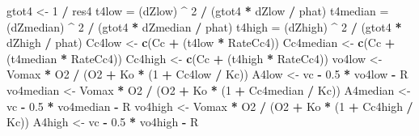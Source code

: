 \documentclass[
]{krantz}
\makeatletter
\newenvironment{Shaded}{\begin{snugshade}}{\end{snugshade}}
\newcommand{\DecValTok}[1]{\textcolor[rgb]{0.00,0.00,0.81}{#1}}
\newcommand{\FloatTok}[1]{\textcolor[rgb]{0.00,0.00,0.81}{#1}}
\newcommand{\KeywordTok}[1]{\textcolor[rgb]{0.13,0.29,0.53}{\textbf{#1}}}
\newcommand{\NormalTok}[1]{#1}
\newcommand{\OperatorTok}[1]{\textcolor[rgb]{0.81,0.36,0.00}{\textbf{#1}}}
\newcommand{\StringTok}[1]{\textcolor[rgb]{0.31,0.60,0.02}{#1}}
\newenvironment{kframe}{%
\medskip{}
\setlength{\fboxsep}{.8em}
 \def\at@end@of@kframe{}%
 \ifinner\ifhmode%
  \def\at@end@of@kframe{\end{minipage}}%
  \begin{minipage}{\columnwidth}%
 \fi\fi%
 \def\FrameCommand##1{\hskip\@totalleftmargin \hskip-\fboxsep
 \colorbox{shadecolor}{##1}\hskip-\fboxsep
     \hskip-\linewidth \hskip-\@totalleftmargin \hskip\columnwidth}%
 \MakeFramed {\advance\hsize-\width
   \@totalleftmargin\z@ \linewidth\hsize
   \@setminipage}}%
 {\par\unskip\endMakeFramed%
 \at@end@of@kframe}
\renewenvironment{Shaded}{\begin{kframe}}{\end{kframe}}
\makeatother
\begin{document}
\begin{Shaded}
\begin{Highlighting}[]
\NormalTok{gtot4 <-}\StringTok{ }\DecValTok{1} \OperatorTok{/}\StringTok{ }\NormalTok{res4}
\NormalTok{t4low =}\StringTok{ }\NormalTok{(dZlow) }\OperatorTok{^}\StringTok{ }\DecValTok{2} \OperatorTok{/}\StringTok{ }\NormalTok{(gtot4 }\OperatorTok{*}\StringTok{ }\NormalTok{dZlow }\OperatorTok{/}\StringTok{ }\NormalTok{phat)}
\NormalTok{t4median =}\StringTok{ }\NormalTok{(dZmedian) }\OperatorTok{^}\StringTok{ }\DecValTok{2} \OperatorTok{/}\StringTok{ }\NormalTok{(gtot4 }\OperatorTok{*}\StringTok{ }\NormalTok{dZmedian }\OperatorTok{/}\StringTok{ }\NormalTok{phat)}
\NormalTok{t4high =}\StringTok{ }\NormalTok{(dZhigh) }\OperatorTok{^}\StringTok{ }\DecValTok{2} \OperatorTok{/}\StringTok{ }\NormalTok{(gtot4 }\OperatorTok{*}\StringTok{ }\NormalTok{dZhigh }\OperatorTok{/}\StringTok{ }\NormalTok{phat)}
\NormalTok{Cc4low <-}\StringTok{ }\KeywordTok{c}\NormalTok{(Cc }\OperatorTok{+}\StringTok{ }\NormalTok{(t4low }\OperatorTok{*}\StringTok{ }\NormalTok{RateCc4))}
\NormalTok{Cc4median <-}\StringTok{ }\KeywordTok{c}\NormalTok{(Cc }\OperatorTok{+}\StringTok{ }\NormalTok{(t4median }\OperatorTok{*}\StringTok{ }\NormalTok{RateCc4))}
\NormalTok{Cc4high <-}\StringTok{ }\KeywordTok{c}\NormalTok{(Cc }\OperatorTok{+}\StringTok{ }\NormalTok{(t4high }\OperatorTok{*}\StringTok{ }\NormalTok{RateCc4))}
\NormalTok{vo4low <-}\StringTok{ }\NormalTok{Vomax }\OperatorTok{*}\StringTok{ }\NormalTok{O2 }\OperatorTok{/}\StringTok{ }\NormalTok{(O2 }\OperatorTok{+}\StringTok{ }\NormalTok{Ko }\OperatorTok{*}\StringTok{ }\NormalTok{(}\DecValTok{1} \OperatorTok{+}\StringTok{ }\NormalTok{Cc4low }\OperatorTok{/}\StringTok{ }\NormalTok{Kc)) }
\NormalTok{A4low <-}\StringTok{ }\NormalTok{vc }\OperatorTok{-}\StringTok{ }\FloatTok{0.5} \OperatorTok{*}\StringTok{ }\NormalTok{vo4low }\OperatorTok{-}\StringTok{ }\NormalTok{R }
\NormalTok{vo4median <-}\StringTok{ }\NormalTok{Vomax }\OperatorTok{*}\StringTok{ }\NormalTok{O2 }\OperatorTok{/}\StringTok{ }\NormalTok{(O2 }\OperatorTok{+}\StringTok{ }\NormalTok{Ko }\OperatorTok{*}\StringTok{ }\NormalTok{(}\DecValTok{1} \OperatorTok{+}\StringTok{ }\NormalTok{Cc4median }\OperatorTok{/}\StringTok{ }\NormalTok{Kc)) }
\NormalTok{A4median <-}\StringTok{ }\NormalTok{vc }\OperatorTok{-}\StringTok{ }\FloatTok{0.5} \OperatorTok{*}\StringTok{ }\NormalTok{vo4median }\OperatorTok{-}\StringTok{ }\NormalTok{R }
\NormalTok{vo4high <-}\StringTok{ }\NormalTok{Vomax }\OperatorTok{*}\StringTok{ }\NormalTok{O2 }\OperatorTok{/}\StringTok{ }\NormalTok{(O2 }\OperatorTok{+}\StringTok{ }\NormalTok{Ko }\OperatorTok{*}\StringTok{ }\NormalTok{(}\DecValTok{1} \OperatorTok{+}\StringTok{ }\NormalTok{Cc4high }\OperatorTok{/}\StringTok{ }\NormalTok{Kc)) }
\NormalTok{A4high <-}\StringTok{ }\NormalTok{vc }\OperatorTok{-}\StringTok{ }\FloatTok{0.5} \OperatorTok{*}\StringTok{ }\NormalTok{vo4high }\OperatorTok{-}\StringTok{ }\NormalTok{R }


\end{Highlighting}
\end{Shaded}
\end{document}
